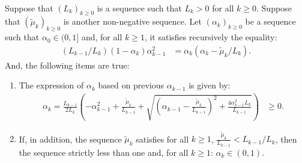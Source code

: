 \documentclass[12pt]{article}
\begin{document}
    \begin{lemma}\;\label{lemma:snapg-v2-seq-range}\\
        Suppose that $(L_k)_{k \ge 0}$ is a sequence such that $L_k > 0$ for all $k \ge 0$. 
        Suppose that $(\tilde\mu_k)_{k\ge 0}$ is another non-negative sequence. 
        Let $(\alpha_k)_{k \ge 0}$ be a sequence such that $\alpha_0 \in (0, 1]$ and, for all $k \ge 1$, it satisfies recursively the equality: 
        \begin{align*}
            (L_{k - 1}/L_k)(1 - \alpha_{k})\alpha_{k - 1}^2 
            &= \alpha_{k}\left(\alpha_{k} - \tilde \mu_k/L_k\right). 
        \end{align*}
        And, the following items are true: 
        \begin{enumerate}
            \item The expression of $\alpha_k$ based on previous $\alpha_{k - 1}$ is given by: 
            \begin{align*}
                \alpha_k = \frac{L_{k - 1}}{2L_k} \left(
                    - \alpha_{k - 1}^2 + \frac{\tilde\mu_k}{L_{k - 1}}
                    + \sqrt{
                        \left(
                            \alpha_{k - 1} - \frac{\tilde\mu_k}{L_{k - 1}}
                        \right)^2
                        + \frac{4\alpha_{k - 1}^2L_k}{L_{k - 1}}
                    }
                \right) &\ge 0. 
            \end{align*}
            \item If, in addition, the sequence $\tilde \mu_k$ satisfies for all $k \ge 1$, $\frac{\tilde \mu_k}{L_{k - 1}} < L_{k - 1}/ L_k$, then the sequence strictly less than one and, for all $k \ge 1$: $\alpha_k \in (0, 1)$. 
        \end{enumerate}
    \end{lemma}
\end{document}
